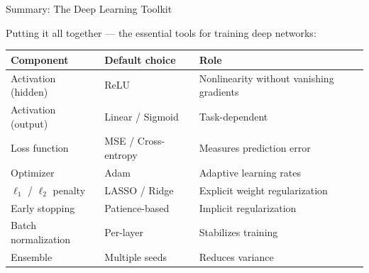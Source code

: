 \documentclass[aspectratio=169]{beamer}
\begin{document}
\begin{frame}{Summary: The Deep Learning Toolkit}

Putting it all together --- the essential tools for training deep networks:

\vspace{0.3cm}
\begin{center}
\renewcommand{\arraystretch}{1.4}
\begin{tabular}{l l l}
\hline
\textbf{Component} & \textbf{Default choice} & \textbf{Role} \\
\hline
Activation (hidden) & ReLU & Nonlinearity without vanishing gradients \\
Activation (output) & Linear / Sigmoid & Task-dependent \\
Loss function & MSE / Cross-entropy & Measures prediction error \\
Optimizer & Adam & Adaptive learning rates \\
$\ell_1$ / $\ell_2$ penalty & LASSO / Ridge & Explicit weight regularization \\
Early stopping & Patience-based & Implicit regularization \\
Batch normalization & Per-layer & Stabilizes training \\
Ensemble & Multiple seeds & Reduces variance \\
\hline
\end{tabular}
\end{center}
\end{frame}
%
\end{document}
